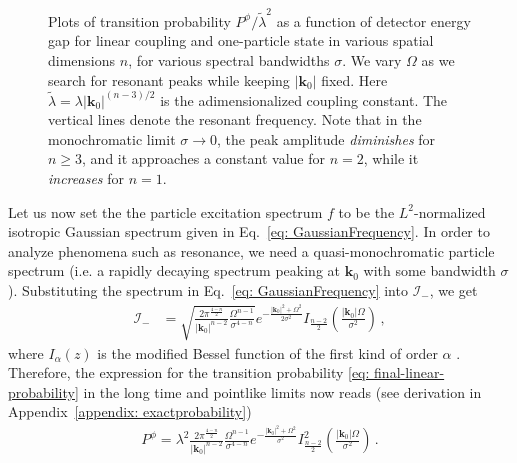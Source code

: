 \documentclass[11pt,prd,onecolumn,superscriptaddress,nofootinbib,floatfix,amsmath,amssymb]{revtex4-2}
\newcommand{\bk}{{\bm{k}}}
\begin{document}
\begin{figure}[tp]
        \caption{
        Plots of transition probability $P^\phi/\tilde{\lambda}^2$ as a function of detector energy gap for linear coupling and one-particle state in various spatial dimensions $n$, for various  spectral bandwidths $\sigma$. We vary $\Omega$ as we search for resonant peaks while keeping $|\bk_0|$ fixed. Here $\tilde\lambda = \lambda |\bk_0|^{(n-3)/2}$ is the adimensionalized coupling constant. The vertical lines denote the resonant frequency. Note that in the monochromatic limit $\sigma\to 0$, the peak amplitude \textit{diminishes}  for $n\geq 3$, and it approaches a constant value for $n=2$, while it \textit{increases} for $n=1$.}
        \label{fig: linear_resonance1}
    \end{figure}
    
    Let us now set the the particle excitation spectrum $f$ to be the $L^2$-normalized isotropic Gaussian spectrum given in Eq.~\eqref{eq: GaussianFrequency}. 
    In order to analyze phenomena such as resonance, we need a quasi-monochromatic particle spectrum (i.e. a rapidly decaying spectrum peaking at $\bk_0$ with some bandwidth $\sigma$). Substituting the spectrum in Eq.~\eqref{eq: GaussianFrequency} into $\mathcal{I}_-$, we get
    \begin{align}
        \mathcal{I}_- &= \sqrt{\frac{2\pi ^{\frac{4-n}{2}}}{|\bk_0|^{n-2}} \frac{\Omega ^{n-1}}{\sigma^{4-n}}} e^{-\frac{|\bk_0|^2+\Omega ^2}{2\sigma ^2}} I_{\frac{n-2}{2}}\left(\frac{|\bk_0| \Omega }{\sigma ^2}\right)\,,
    \end{align}
    where $I_\alpha(z)$ is the modified Bessel function of the first kind of order $\alpha$ \cite{NIST:DLMF}. 
    Therefore, the expression for the transition probability \eqref{eq: final-linear-probability} in the long time and pointlike limits now reads (see derivation in Appendix~\ref{appendix: exactprobability})
    \begin{align}
        P^\phi = 
        \lambda^2 \frac{2\pi ^{\frac{4-n}{2}}}{|\bk_0|^{n-2}} \frac{\Omega ^{n-1}}{\sigma^{4-n}} e^{-\frac{|\bk_0|^2+\Omega ^2}{\sigma ^2}} I^2_{\frac{n-2}{2}}\left(\frac{|\bk_0| \Omega }{\sigma ^2}\right)\,.
        \label{eq: prob-linear-gaussian-final}
    \end{align}
\end{document}
